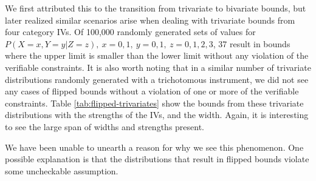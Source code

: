\documentclass[
]{article}
\theoremstyle{plain}
\begin{document}
We first attributed this to the transition from trivariate to bivariate bounds, but later realized similar scenarios arise when dealing with trivariate bounds from four category IVs. Of 100,000 randomly generated sets of values for \(P(X = x, Y = y | Z = z),\ x=0,1,\ y=0,1,\ z=0,1,2,3\), 37 result in bounds where the upper limit is smaller than the lower limit without any violation of the verifiable constraints. It is also worth noting that in a similar number of trivariate distributions randomly generated with a trichotomous instrument, we did not see any cases of flipped bounds without a violation of one or more of the verifiable constraints. Table \ref{tab:flipped-trivariates} show the bounds from these trivariate distributions with the strengths of the IVs, and the width. Again, it is interesting to see the large span of widths and strengths present.

We have been unable to unearth a reason for why we see this phenomenon. One possible explanation is that the distributions that result in flipped bounds violate some uncheckable assumption.

\begingroup\fontsize{9}{11}\selectfont
\end{document}
